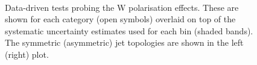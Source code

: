 \begin{figure}[h!]
  \begin{center}
    ~~
    \caption{Data-driven tests probing the W polarisation effects. 
      These are shown for each
      \njet category (open symbols) overlaid on top of the systematic
      uncertainty estimates used for each \scalht bin
      (shaded bands). 
      The symmetric (asymmetric) jet topologies are shown in the left (right) plot.       
    }
    \label{fig:closureMuPToMuM}
  \end{center} 
\end{figure}

